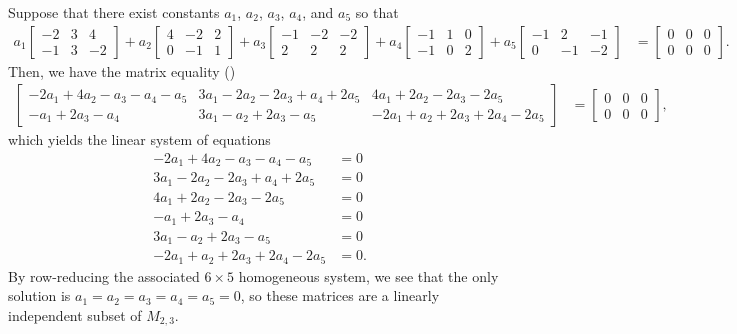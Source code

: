 Suppose that there exist constants $a_1$, $a_2$, $a_3$, $a_4$, and $a_5$ so that 
\begin{align*}
a_1 \begin{bmatrix} -2 & 3 & 4 \\ -1 & 3 & -2 \end{bmatrix}  + 
a_2 \begin{bmatrix} 4 & -2 & 2 \\ 0 & -1 & 1 \end{bmatrix}  + 
a_3 \begin{bmatrix} -1 & -2 & -2 \\ 2 & 2 & 2  \end{bmatrix}  + 
a_4 \begin{bmatrix}  -1 & 1 & 0\\ -1 & 0 & 2 \end{bmatrix}  + 
a_5 \begin{bmatrix} -1 & 2 & -1\\ 0 & -1 & -2 \end{bmatrix}   
&=
\begin{bmatrix} 0 & 0 & 0\\0 & 0 & 0 \end{bmatrix}.
\end{align*}
Then, we have the matrix equality ()
\begin{align*}
\begin{bmatrix} 
-2a_1 + 4a_2 - a_3 - a_4 - a_5 & 3a_1 - 2a_2 - 2a_3 + a_4 + 2a_5 & 4a_1 + 2a_2 - 2a_3 - 2a_5\\
-a_1  + 2a_3 - a_4 & 3a_1 - a_2 + 2a_3 - a_5 & -2a_1 + a_2 + 2a_3 + 2a_4 - 2a_5
\end{bmatrix} 
&= 
\begin{bmatrix} 0 & 0 & 0\\0 & 0 & 0 \end{bmatrix},
\end{align*}
which yields the linear system of equations
\begin{align*}
-2a_1 + 4a_2 - a_3 - a_4 - a_5 &= 0\\
3a_1 - 2a_2 - 2a_3 + a_4 + 2a_5&= 0\\
4a_1 + 2a_2 - 2a_3 - 2a_5&=0\\
-a_1  + 2a_3 - a_4 &= 0\\
 3a_1 - a_2 + 2a_3 - a_5 &= 0\\
 -2a_1 + a_2 + 2a_3 + 2a_4 - 2a_5 &= 0.
\end{align*}
By row-reducing the associated $6\times 5$ homogeneous system, we see that the only solution is 
$ a_1 = a_2 = a_3 = a_4 = a_5 = 0$, so these matrices are a linearly independent subset of $M_{2,3}$.

